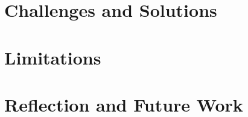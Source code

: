 \label{chapter:evaluation}


\section{Challenges and Solutions}

\section{Limitations}

\section{Reflection and Future Work}
